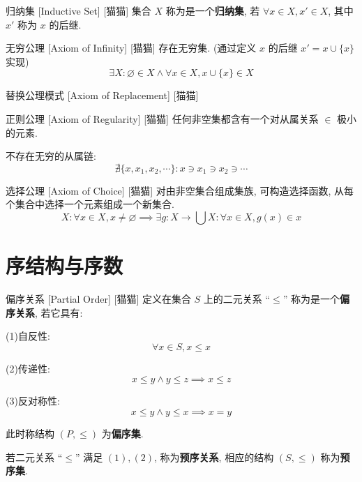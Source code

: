 \documentclass[UTF8]{ctexart}
\begin{document}
    \begin{dfn}
        []
        {归纳集}
        [Inductive Set]
        [猫猫]
        集合 \(X\) 称为是一个\textbf{归纳集}, 若 \(\forall x\in X, x'\in X\), 其中 \(x'\) 称为 \(x\) 的后继. 
    \end{dfn}
    
    \begin{axm}
        []
        {无穷公理}
        [Axiom of Infinity]
        [猫猫]
        存在无穷集. (通过定义 \(x\) 的后继 \(x'=x\cup\{x\}\) 实现)
        \[\exists X: \varnothing\in X\wedge\forall x\in X, x\cup\{x\}\in X\]
    \end{axm}
    
    \begin{axm}
        []
        {替换公理模式}
        [Axiom of Replacement]
        [猫猫]
    \end{axm}
    
    \begin{axm}
        []
        {正则公理}
        [Axiom of Regularity]
        [猫猫]
        任何非空集都含有一个对从属关系 \(\in\) 极小的元素. 
    \end{axm}
    
    \begin{thm}
        {}
        不存在无穷的从属链: 
        \[\nexists \{x,x_1,x_2,\cdots\}: x\ni x_1\ni x_2\ni \cdots\]
    \end{thm}
    
    \begin{axm}
        []
        {选择公理}
        [Axiom of Choice]
        [猫猫]
        对由非空集合组成集族, 可构造选择函数, 从每个集合中选择一个元素组成一个新集合. 
        \[X: \forall x\in X, x\neq\varnothing\implies\exists g:X\to\bigcup X: \forall x\in X, g(x)\in x\]
    \end{axm}

\section{序结构与序数}

    \begin{dfn}
        []
        {偏序关系}
        [Partial Order]
        [猫猫]
        定义在集合 \(S\) 上的二元关系 ``\(\leq\)'' 称为是一个\textbf{偏序关系}, 若它具有: 

        (1)自反性: 
        \[\forall x\in S, x\leq x\]
        
        (2)传递性: 
        \[x\leq y\wedge y\leq z\implies x\leq z\]

        (3)反对称性: 
        \[x\leq y\wedge y\leq x\implies x=y\]

        此时称结构 \((P,\leq)\) 为\textbf{偏序集}. 

        若二元关系 ``\(\leq\)'' 满足  \((1), (2)\), 称为\textbf{预序关系}, 相应的结构 \((S,\leq)\) 称为\textbf{预序集}. 
    \end{dfn}
    
\end{document}
